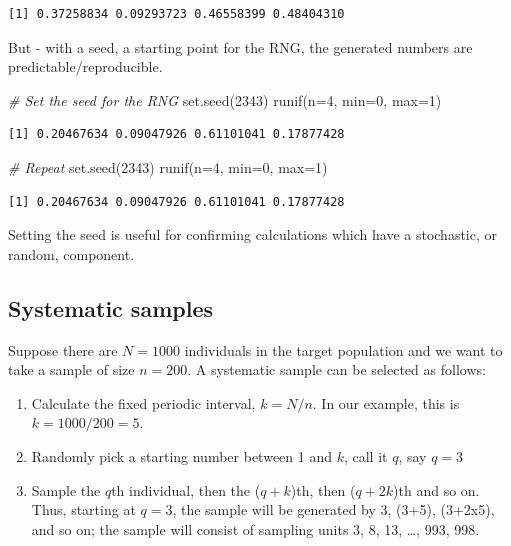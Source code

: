 \documentclass[
  oneside]{krantz}
\newenvironment{Shaded}{\begin{snugshade}}{\end{snugshade}}
\newcommand{\AttributeTok}[1]{\textcolor[rgb]{0.77,0.63,0.00}{#1}}
\newcommand{\CommentTok}[1]{\textcolor[rgb]{0.56,0.35,0.01}{\textit{#1}}}
\newcommand{\DecValTok}[1]{\textcolor[rgb]{0.00,0.00,0.81}{#1}}
\newcommand{\FunctionTok}[1]{\textcolor[rgb]{0.00,0.00,0.00}{#1}}
\newcommand{\NormalTok}[1]{#1}
\begin{document}
\begin{verbatim}
[1] 0.37258834 0.09293723 0.46558399 0.48404310
\end{verbatim}

But - with a seed, a starting point for the RNG, the generated numbers are predictable/reproducible.

\begin{Shaded}
\begin{Highlighting}[]
\CommentTok{\# Set the seed for the RNG}
\FunctionTok{set.seed}\NormalTok{(}\DecValTok{2343}\NormalTok{)}
\FunctionTok{runif}\NormalTok{(}\AttributeTok{n=}\DecValTok{4}\NormalTok{, }\AttributeTok{min=}\DecValTok{0}\NormalTok{, }\AttributeTok{max=}\DecValTok{1}\NormalTok{)}
\end{Highlighting}
\end{Shaded}

\begin{verbatim}
[1] 0.20467634 0.09047926 0.61101041 0.17877428
\end{verbatim}

\begin{Shaded}
\begin{Highlighting}[]
\CommentTok{\# Repeat}
\FunctionTok{set.seed}\NormalTok{(}\DecValTok{2343}\NormalTok{)}
\FunctionTok{runif}\NormalTok{(}\AttributeTok{n=}\DecValTok{4}\NormalTok{, }\AttributeTok{min=}\DecValTok{0}\NormalTok{, }\AttributeTok{max=}\DecValTok{1}\NormalTok{)}
\end{Highlighting}
\end{Shaded}

\begin{verbatim}
[1] 0.20467634 0.09047926 0.61101041 0.17877428
\end{verbatim}

Setting the seed is useful for confirming calculations which have a stochastic, or random, component.

\hypertarget{systematic-samples}{%
\subsection{Systematic samples}\label{systematic-samples}}

Suppose there are \(N=1000\) individuals in the target population and we want to take a sample of size \(n=200\). A systematic sample can be selected as follows:

\begin{enumerate}
\def\labelenumi{\arabic{enumi}.}
\item
  Calculate the fixed periodic interval, \(k = N/n\). In our example, this is \(k = 1000/200 = 5\).
\item
  Randomly pick a starting number between 1 and \(k\), call it \(q\), say \(q=3\)
\item
  Sample the \(q\)th individual, then the (\(q+k\))th, then (\(q+2k\))th and so on. Thus, starting at \(q=3\), the sample will be generated by 3, (3+5), (3+2x5), and so on; the sample will consist of sampling units 3, 8, 13, \ldots, 993, 998.
\end{enumerate}
\end{document}
